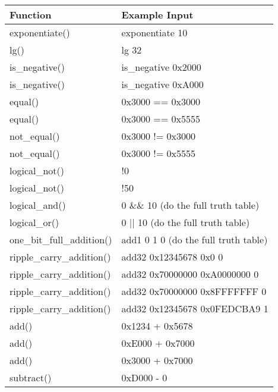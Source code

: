 \begin{tabular}[h]{ll}

Function                        &  Example Input                        \\ \hline
exponentiate()                  &  exponentiate 10                      \\
lg()                            &  lg 32                                \\
is\_negative()                  &  is\_negative 0x2000                  \\
is\_negative()                  &  is\_negative 0xA000                  \\
equal()                         &  0x3000 == 0x3000                     \\
equal()                         &  0x3000 == 0x5555                     \\
not\_equal()                    &  0x3000 != 0x3000                     \\
not\_equal()                    &  0x3000 != 0x5555                     \\
logical\_not()                  &  !0                                   \\
logical\_not()                  &  !50                                  \\
logical\_and()                  &  0 \&\& 10 (do the full truth table)  \\
logical\_or()                   &  0 $||$ 10 (do the full truth table)  \\
one\_bit\_full\_addition()      &  add1 0 1 0 (do the full truth table) \\
ripple\_carry\_addition()       &  add32 0x12345678 0x0 0               \\
ripple\_carry\_addition()       &  add32 0x70000000 0xA0000000 0        \\
ripple\_carry\_addition()       &  add32 0x70000000 0x8FFFFFFF 0        \\
ripple\_carry\_addition()       &  add32 0x12345678 0x0FEDCBA9 1        \\
add()                           &  0x1234 + 0x5678                      \\
add()                           &  0xE000 + 0x7000                      \\
add()                           &  0x3000 + 0x7000                      \\
subtract()                      &  0xD000 - 0                           \\

\end{tabular}
